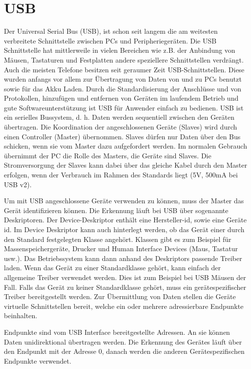 \documentclass[12pt,journal,compsoc]{IEEEtran}
\begin{document}
\section{USB}
Der Universal Serial Bus (USB), ist schon seit langem die am weitesten verbreitete Schnittstelle zwischen PCs und Peripheriegeräten.
Die USB Schnittstelle hat mittlerweile in vielen Bereichen wie z.B. der Anbindung von Mäusen, Tastaturen und Festplatten andere speziellere Schnittstellen verdrängt.
Auch die meisten Telefone besitzen seit geraumer Zeit USB-Schnittstellen. Diese wurden anfangs vor allem zur Übertragung von Daten von und zu PCs benutzt sowie für das Akku Laden.
Durch die Standardisierung der Anschlüsse und von Protokollen, hinzufügen und entfernen von Geräten im laufendem Betrieb und gute Softwareunterstützung ist USB für Anwender einfach zu bedienen.
USB ist ein serielles Bussystem, d. h. Daten werden sequentiell zwischen den Geräten übertragen. 
Die Koordination der angeschlossenen Geräte (Slaves) wird durch einen Controller (Master) übernommen.
Slaves dürfen nur Daten über den Bus schicken, wenn sie vom Master dazu aufgefordert werden.
Im normalen Gebrauch übernimmt der PC die Rolle des Masters, die Geräte sind Slaves. Die Stromversorgung der Slaves kann dabei über das gleiche Kabel durch den Master erfolgen, wenn der Verbrauch im Rahmen des Standards liegt (5V, 500mA bei USB v2).

Um mit USB angeschlossene Geräte verwenden zu können, muss der Master das Gerät identifizieren können. 
Die Erkennung läuft bei USB über sogenannte Deskriptoren. 
Der Device-Deskriptor enthält eine Hersteller-id, sowie eine Geräte id.
Im Device Deskriptor kann auch hinterlegt werden, ob das Gerät einer durch den Standard festgelegten Klasse angehört. 
Klassen gibt es zum Beispiel für Massenspeichergeräte, Drucker und Human Interface Devices (Maus, Tastatur usw.).
Das Betriebssystem kann dann anhand des Deskriptors passende Treiber laden. Wenn das Gerät zu einer Standardklasse gehört, kann einfach der allgemeine Treiber verwendet werden. Dies ist zum Beispiel bei USB Mäusen der Fall.
Falls das Gerät zu keiner Standardklasse gehört, muss ein gerätespezifischer Treiber bereitgestellt werden.
Zur Übermittlung von Daten stellen die Geräte virtuelle Schnittstellen bereit, welche ein oder mehrere adressierbare Endpunkte beinhalten. 

Endpunkte sind vom USB Interface bereitgestellte Adressen. An sie können Daten unidirektional übertragen werden.
Die Erkennung des Gerätes läuft über den Endpunkt mit der Adresse 0, danach werden die anderen Gerätespezifischen Endpunkte verwendet.
\end{document}
